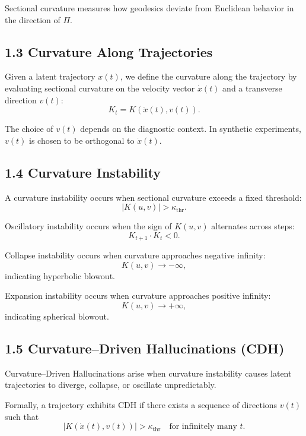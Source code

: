 Sectional curvature measures how geodesics deviate from Euclidean
behavior in the direction of $\Pi$.

\subsection*{1.3 Curvature Along Trajectories}

Given a latent trajectory $x(t)$, we define the curvature along the
trajectory by evaluating sectional curvature on the velocity vector
$\dot{x}(t)$ and a transverse direction $v(t)$:
\[
K_t = K(\dot{x}(t), v(t)).
\]

The choice of $v(t)$ depends on the diagnostic context. In synthetic
experiments, $v(t)$ is chosen to be orthogonal to $\dot{x}(t)$.

\subsection*{1.4 Curvature Instability}

A curvature instability occurs when sectional curvature exceeds a fixed
threshold:
\[
|K(u,v)| > \kappa_{\mathrm{thr}}.
\]

Oscillatory instability occurs when the sign of $K(u,v)$ alternates
across steps:
\[
K_{t+1} \cdot K_t < 0.
\]

Collapse instability occurs when curvature approaches negative infinity:
\[
K(u,v) \to -\infty,
\]
indicating hyperbolic blowout.

Expansion instability occurs when curvature approaches positive infinity:
\[
K(u,v) \to +\infty,
\]
indicating spherical blowout.

\subsection*{1.5 Curvature–Driven Hallucinations (CDH)}

Curvature–Driven Hallucinations arise when curvature instability causes
latent trajectories to diverge, collapse, or oscillate unpredictably.

Formally, a trajectory exhibits CDH if there exists a sequence of
directions $v(t)$ such that
\[
|K(\dot{x}(t), v(t))| > \kappa_{\mathrm{thr}}
\quad \text{for infinitely many } t.
\]

